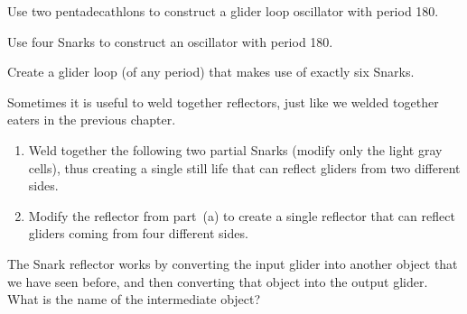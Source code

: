 \begin{multicols}{2}
\begin{problemstar}
		\begin{center}
		\end{center}
	
	\end{problemstar}
	
	
	\mfilbreak
	
	
	\begin{problem}\label{exer:pentadecathlon_relay_180}
		Use two pentadecathlons to construct a glider loop oscillator with period 180.
	\end{problem}
	
	
	\mfilbreak
	
	
	\begin{problem}\label{exer:snark_relay_180}
		Use four Snarks to construct an oscillator with period 180.
	\end{problem}
	
	
	\mfilbreak
	
	
	\begin{problemstar}\label{exer:six_snark_relay}
		Create a glider loop (of any period) that makes use of exactly six Snarks.
	\end{problemstar}
	
	
	\mfilbreak
	
	\begin{problemstar}\label{exer:snark_weld}
		Sometimes it is useful to weld together reflectors, just like we welded together eaters in the previous chapter.
		\begin{enumerate}[label=\bf\color{ocre}(\alph*)]
			\item Weld together the following two partial Snarks (modify only the light gray cells), thus creating a single still life that can reflect gliders from two different sides.
			\begin{center}
			\end{center}
			
			\item Modify the reflector from part~(a) to create a single reflector that can reflect gliders coming from four different sides.
		\end{enumerate}
	\end{problemstar}
	
	
	\mfilbreak
	
	
	\begin{problemstar}\label{exer:snark_creates_honeyfarm}
		The Snark reflector works by converting the input glider into another object that we have seen before, and then converting that object into the output glider. What is the name of the intermediate object?
	\end{problemstar}
	

\end{multicols}
